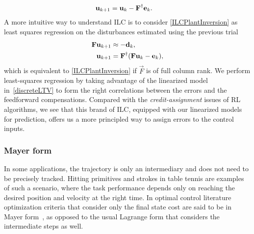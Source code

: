 %
\begin{equation}
\begin{aligned}
\boldsymbol{\mathrm{u}}_{k+1} &= \boldsymbol{\mathrm{u}}_k - \boldsymbol{\mathrm{F}}^{\dagger}\boldsymbol{\mathrm{e}}_k.
\end{aligned}
\label{ILCPlantInversion}
\end{equation}
%
%
\noindent A more intuitive way to understand ILC is to consider \eqref{ILCPlantInversion} as least squares regression on the disturbances estimated using the previous trial~\cite{Schoellig12}
%
\begin{equation}
\begin{aligned}
\boldsymbol{\mathrm{F}}\boldsymbol{\mathrm{u}}_{k+1} &\approx -\boldsymbol{\mathrm{d}}_{k},\\
\boldsymbol{\mathrm{u}}_{k+1} &= \boldsymbol{\mathrm{F}}^{\dagger}(\boldsymbol{\mathrm{F}}\boldsymbol{\mathrm{u}}_{k} - \boldsymbol{\mathrm{e}}_k),
\end{aligned}
\label{ILCasRegression}
\end{equation}
%
\noindent which is equivalent to \eqref{ILCPlantInversion} if $\vec{F}$ is of full column rank. We perform least-squares regression by taking advantage of the linearized model in~\eqref{discreteLTV} to form the right correlations between the errors and the feedforward compensations. Compared with the \emph{credit-assignment} issues of RL algorithms, we see that this brand of ILC, equipped with our linearized models for prediction, offers us a more principled way to assign errors to the control inputs.

\subsubsection{Mayer form}

In some applications, the trajectory is only an intermediary and does not need to be precisely tracked. Hitting primitives and strokes in table tennis are examples of such a scenario, where the task performance depends only on reaching the desired position and velocity at the right time. In optimal control literature optimization criteria that consider only the final state cost are said to be in Mayer form~\cite{Liberzon11}, as opposed to the usual Lagrange form that considers the intermediate steps as well.


